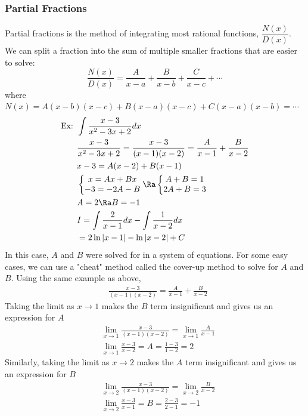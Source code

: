 \subsubsection{Partial Fractions}
Partial fractions is the method of integrating most rational functions, $\dfrac{N(x)}{D(x)}$.\\
We can split a fraction into the sum of multiple smaller fractions that are easier to solve:
$$\frac{N(x)}{D(x)}=\frac{A}{x-a}+\frac{B}{x-b}+\frac{C}{x-c}+\cdots$$
where $N(x)=A(x-b)(x-c)+B(x-a)(x-c)+C(x-a)(x-b)=\cdots$
\begin{align*}
    \text{Ex: }&\int\frac{x-3}{x^2-3x+2}dx\\
    &\frac{x-3}{x^2-3x+2}=\frac{x-3}{(x-1)(x-2)}=\frac{A}{x-1}+\frac{B}{x-2}\\
    &x-3=A(x-2)+B(x-1)\\
    &\left\{\begin{matrix} x=Ax+Bx\\
    -3=-2A-B
    \end{matrix}\right.\Ra \left\{\begin{matrix} A+B=1\\
    2A+B=3
    \end{matrix}\right.\\
    &A=2\Ra B=-1\\
    &I=\int\frac{2}{x-1}dx-\int\frac{1}{x-2}dx\\
    &=2\ln|x-1|-\ln|x-2|+C
\end{align*}
In this case, $A$ and $B$ were solved for in a system of equations. For some easy cases, we can use a "cheat" method called the cover-up method to solve for $A$ and $B$. Using the same example as above,
\begin{align*}
    &\frac{x-3}{(x-1)(x-2)}=\frac{A}{x-1}+\frac{B}{x-2}
\end{align*}
Taking the limit as $x\to 1$ makes the $B$ term insignificant and gives us an expression for $A$
\begin{align*}
    &\lim_{x\to 1}\frac{x-3}{(x-1)(x-2)}=\lim_{x\to 1}\frac{A}{x-1}\\
    &\lim_{x\to1}\frac{x-3}{x-2}=A=\frac{1-3}{1-2}=2
\end{align*}
Similarly, taking the limit as $x\to 2$ makes the $A$ term insignificant and gives us an expression for $B$
\begin{align*}
    &\lim_{x\to 2}\frac{x-3}{(x-1)(x-2)}=\lim_{x\to 2}\frac{B}{x-2}\\
    &\lim_{x\to2}\frac{x-3}{x-1}=B=\frac{2-3}{2-1}=-1
\end{align*}

